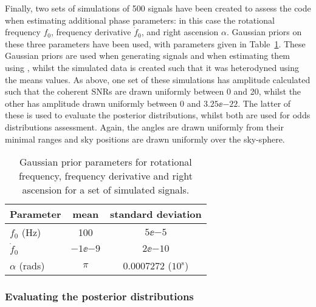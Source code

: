 Finally, two sets of simulations of 500 signals have been created to assess the code when estimating additional phase parameters: in this case
the rotational frequency $f_0$, frequency derivative $\dot{f}_0$, and right ascension $\alpha$. Gaussian priors on these three parameters have been
used, with parameters given in Table~\ref{tab:gaussianpriors}. These Gaussian priors are used when generating signals and when estimating them
using \lppen, whilst the simulated data is created such that it was heterodyned using the means values. As above, one set of these simulations has amplitude 
calculated such that the coherent SNRs are drawn uniformly between 0 and 20, whilst the other has amplitude drawn uniformly between 0 and $3.25\ee{-22}$.
The latter of these is used to evaluate the posterior distributions, whilst both are used for odds distributions assessment. Again, the angles are drawn
uniformly from their minimal ranges and sky positions are drawn uniformly over the sky-sphere.

\begin{table}[!hptb]
\caption{Gaussian prior parameters for rotational frequency, frequency derivative and right ascension for a set of simulated signals.
\label{tab:gaussianpriors}}
\begin{center}
\begin{tabular}{l | c c}
\hline
Parameter & mean & standard deviation \\                      
\hline
\hline
$f_0$ (Hz) & 100 & $5\ee{-5}$ \\
$\dot{f}_0$ & $-1\ee{-9}$ & $2\ee{-10}$ \\
$\alpha$ (rads) & $\pi$ & $0.0007272$ ($10^{\text{s}}$) \\
\hline
\end{tabular}
\end{center}
\end{table}

\subsubsection{Evaluating the posterior distributions}\label{sec:ppplots}

